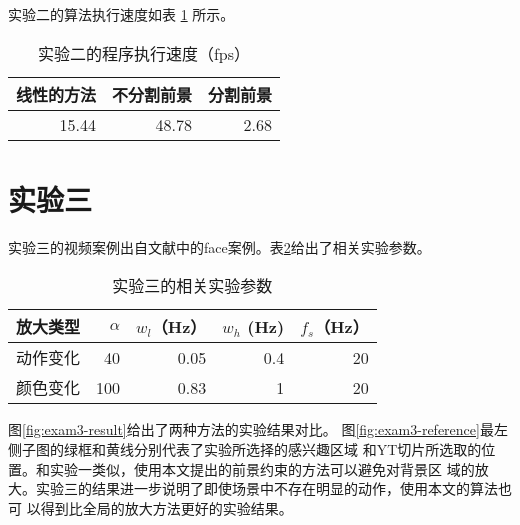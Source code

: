 实验二的算法执行速度如表 \ref{tab:time2} 所示。

\begin{table}[htbp]
  \centering
  \caption{实验二的程序执行速度（fps）}
  \label{tab:time2}
  \begin{tabular}[c]{rrr}
    \toprule[1.5pt]
    线性的方法 & 不分割前景 & 分割前景 \\
    \midrule
    15.44 & 48.78 & 2.68 \\
    \bottomrule[1.5pt]
  \end{tabular}
\end{table}


\section{实验三}
\label{sec:exam-face}

实验三的视频案例出自文献\cite{wu2012eulerian}中的face案例。表\ref{tab:exam3-data}给出了相关实验参数。

\begin{table}[htbp]
  \centering
  \caption{实验三的相关实验参数}
  \label{tab:exam3-data}
  \begin{tabular}[c]{crrrr}
    \toprule[1.5pt]
    放大类型 & $\alpha$ & $w_l$（Hz） & $w_h$ (Hz) & $f_s$（Hz）\\
    \midrule
    动作变化 & 40 & 0.05 & 0.4 & 20 \\
    颜色变化 & 100 & 0.83 & 1 & 20 \\
    \bottomrule[1.5pt]
  \end{tabular}
\end{table}

图\ref{fig:exam3-result}给出了两种方法的实验结果对比。
图\ref{fig:exam3-reference}最左侧子图的绿框和黄线分别代表了实验所选择的感兴趣区域
和YT切片所选取的位置。和实验一类似，使用本文提出的前景约束的方法可以避免对背景区
域的放大。实验三的结果进一步说明了即使场景中不存在明显的动作，使用本文的算法也可
以得到比全局的放大方法更好的实验结果。

